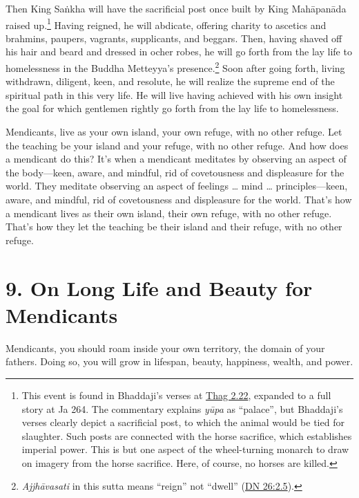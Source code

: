 \documentclass[12pt,openany]{book}%
\begin{document}
Then King \textsanskrit{Saṅkha} will have the sacrificial post once built by King \textsanskrit{Mahāpanāda} raised up.\footnote{This event is found in Bhaddaji’s verses at \href{https://suttacentral.net/thag2.22/en/sujato}{Thag 2.22}, expanded to a full story at Ja 264. The commentary explains \textit{\textsanskrit{yūpa}} as “palace”, but Bhaddaji’s verses clearly depict a sacrificial post, to which the animal would be tied for slaughter. Such posts are connected with the horse sacrifice, which establishes imperial power. This is but one aspect of the wheel-turning monarch to draw on imagery from the horse sacrifice. Here, of course, no horses are killed. } Having reigned, he will abdicate, offering charity to ascetics and brahmins, paupers, vagrants, supplicants, and beggars. Then, having shaved off his hair and beard and dressed in ocher robes, he will go forth from the lay life to homelessness in the Buddha Metteyya’s presence.\footnote{\textit{\textsanskrit{Ajjhāvasati}} in this sutta means “reign” not “dwell” (\href{https://suttacentral.net/dn26/en/sujato\#2.5}{DN 26:2.5}). } Soon after going forth, living withdrawn, diligent, keen, and resolute, he will realize the supreme end of the spiritual path in this very life. He will live having achieved with his own insight the goal for which gentlemen rightly go forth from the lay life to homelessness. 

Mendicants, live as your own island, your own refuge, with no other refuge. Let the teaching be your island and your refuge, with no other refuge. And how does a mendicant do this? It’s when a mendicant meditates by observing an aspect of the body—keen, aware, and mindful, rid of covetousness and displeasure for the world. They meditate observing an aspect of feelings … mind … principles—keen, aware, and mindful, rid of covetousness and displeasure for the world. That’s how a mendicant lives as their own island, their own refuge, with no other refuge. That’s how they let the teaching be their island and their refuge, with no other refuge. 

\section*{9. On Long Life and Beauty for Mendicants }

Mendicants, you should roam inside your own territory, the domain of your fathers. Doing so, you will grow in lifespan, beauty, happiness, wealth, and power. 
\end{document}
